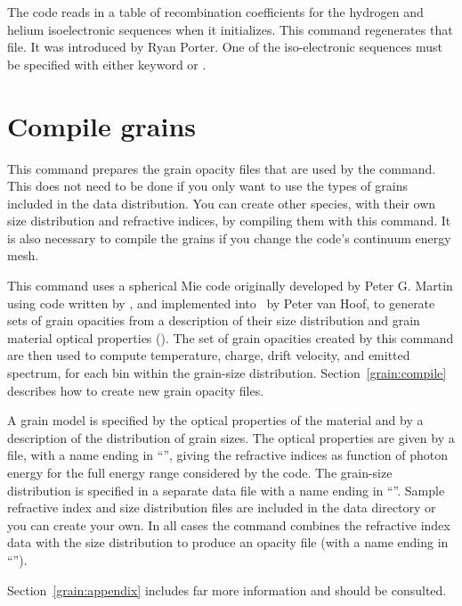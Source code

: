 The code reads in a table of recombination coefficients for the hydrogen and
helium isoelectronic sequences when it initializes.
This command regenerates that file.
It was
introduced by Ryan Porter.
One of the iso-electronic sequences must be
specified with either keyword  or .

\section{Compile grains}
\label{sec:CompileGrains}

This command prepares the grain opacity files that are used by the
 command.
This does not need to be done if you only want to use
the types of grains included in the data distribution.
You can create other species, with their own size
distribution and refractive indices, by compiling them with this command.
It is also necessary to compile the grains if you change the code's
continuum energy mesh.

This command uses a spherical Mie code originally developed by Peter
G. Martin using code written by \citet{Hansen1974}, and implemented
into \Cloudy\ by Peter van Hoof, to generate sets of grain opacities from
a description of their size distribution and grain material optical
properties (\citealp{VanHoof2004}).
The set of grain opacities created by
this  command are then used to
compute temperature, charge, drift
velocity, and emitted spectrum, for each bin within the
grain-size distribution.
Section~\ref{grain:compile} describes how to create new grain opacity files.

A grain model is specified by the optical properties of the material
and by a description of the distribution of grain sizes.
The optical
properties are given by a file, with a name ending in ``'',
giving the
refractive indices as function of photon energy for the full energy range
considered by the code.
The grain-size distribution is specified in a
separate data file with a name ending in ``''.
Sample refractive index
and size distribution files are included in the data directory or you can
create your own.
In all cases the  command combines the refractive
index data with the size distribution to produce an opacity file
(with a name ending in ``'').

Section~\ref{grain:appendix} includes far
more information and should be consulted.

